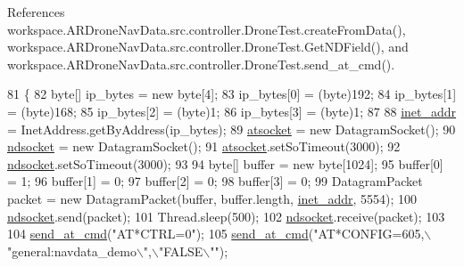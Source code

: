 References workspace.\+A\+R\+Drone\+Nav\+Data.\+src.\+controller.\+Drone\+Test.\+create\+From\+Data(), workspace.\+A\+R\+Drone\+Nav\+Data.\+src.\+controller.\+Drone\+Test.\+Get\+N\+D\+Field(), and workspace.\+A\+R\+Drone\+Nav\+Data.\+src.\+controller.\+Drone\+Test.\+send\+\_\+at\+\_\+cmd().


\begin{DoxyCode}
81     \{   
82         byte[] ip\_bytes = \textcolor{keyword}{new} byte[4];
83         ip\_bytes[0] = (byte)192;
84         ip\_bytes[1] = (byte)168;
85         ip\_bytes[2] = (byte)1;
86         ip\_bytes[3] = (byte)1;
87         
88         \hyperlink{classworkspace_1_1_a_r_drone_nav_data_1_1src_1_1controller_1_1_drone_test_ad9f584d1cccbb5569b2ad8c02f673cef}{inet\_addr} = InetAddress.getByAddress(ip\_bytes);
89         \hyperlink{classworkspace_1_1_a_r_drone_nav_data_1_1src_1_1controller_1_1_drone_test_a8b8310b826caf0954782ea57f745bdaa}{atsocket} = \textcolor{keyword}{new} DatagramSocket();
90         \hyperlink{classworkspace_1_1_a_r_drone_nav_data_1_1src_1_1controller_1_1_drone_test_aa2e62dc18a97d516ddcf7d79c30c74a3}{ndsocket} = \textcolor{keyword}{new} DatagramSocket();
91         \hyperlink{classworkspace_1_1_a_r_drone_nav_data_1_1src_1_1controller_1_1_drone_test_a8b8310b826caf0954782ea57f745bdaa}{atsocket}.setSoTimeout(3000);
92         \hyperlink{classworkspace_1_1_a_r_drone_nav_data_1_1src_1_1controller_1_1_drone_test_aa2e62dc18a97d516ddcf7d79c30c74a3}{ndsocket}.setSoTimeout(3000);
93         
94         byte[] buffer = \textcolor{keyword}{new} byte[1024];
95         buffer[0] = 1;
96         buffer[1] = 0;
97         buffer[2] = 0;
98         buffer[3] = 0;
99         DatagramPacket packet = \textcolor{keyword}{new} DatagramPacket(buffer, buffer.length, 
      \hyperlink{classworkspace_1_1_a_r_drone_nav_data_1_1src_1_1controller_1_1_drone_test_ad9f584d1cccbb5569b2ad8c02f673cef}{inet\_addr}, 5554);
100         \hyperlink{classworkspace_1_1_a_r_drone_nav_data_1_1src_1_1controller_1_1_drone_test_aa2e62dc18a97d516ddcf7d79c30c74a3}{ndsocket}.send(packet);
101         Thread.sleep(500);
102         \hyperlink{classworkspace_1_1_a_r_drone_nav_data_1_1src_1_1controller_1_1_drone_test_aa2e62dc18a97d516ddcf7d79c30c74a3}{ndsocket}.receive(packet);
103         
104         \hyperlink{classworkspace_1_1_a_r_drone_nav_data_1_1src_1_1controller_1_1_drone_test_a5c7c7338901c8cf9a91789656a4aa54f}{send\_at\_cmd}(\textcolor{stringliteral}{"AT*CTRL=0"});
105         \hyperlink{classworkspace_1_1_a_r_drone_nav_data_1_1src_1_1controller_1_1_drone_test_a5c7c7338901c8cf9a91789656a4aa54f}{send\_at\_cmd}(\textcolor{stringliteral}{"AT*CONFIG=605,\(\backslash\)"general:navdata\_demo\(\backslash\)",\(\backslash\)"FALSE\(\backslash\)""});

\end{DoxyCode}
